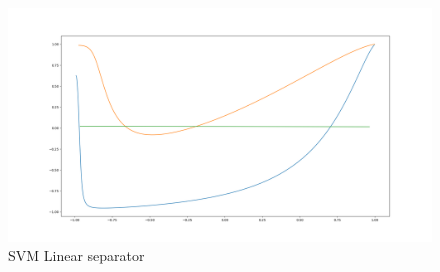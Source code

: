 \documentclass[12pt]{report}
\begin{document}
\begin{figure}[h]
	\begin{center}
		\includegraphics[scale=0.3]{que2}	
		\caption{SVM Linear separator}
		\label{fig:5}
	\end{center}
\end{figure}
\end{document}
